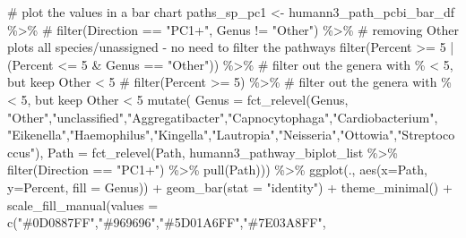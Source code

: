 \documentclass[
  letterpaper,
]{book}
\newenvironment{Shaded}{}{}
\newcommand{\AttributeTok}[1]{\textcolor[rgb]{0.84,0.23,0.29}{#1}}
\newcommand{\CommentTok}[1]{\textcolor[rgb]{0.42,0.45,0.49}{#1}}
\newcommand{\DecValTok}[1]{\textcolor[rgb]{0.00,0.36,0.77}{#1}}
\newcommand{\FunctionTok}[1]{\textcolor[rgb]{0.44,0.26,0.76}{#1}}
\newcommand{\NormalTok}[1]{\textcolor[rgb]{0.14,0.16,0.18}{#1}}
\newcommand{\OtherTok}[1]{\textcolor[rgb]{0.44,0.26,0.76}{#1}}
\newcommand{\SpecialCharTok}[1]{\textcolor[rgb]{0.00,0.36,0.77}{#1}}
\newcommand{\StringTok}[1]{\textcolor[rgb]{0.01,0.18,0.38}{#1}}
\begin{document}
\begin{Shaded}
\begin{Highlighting}[]
\CommentTok{\# plot the values in a bar chart}
\NormalTok{paths\_sp\_pc1 }\OtherTok{\textless{}{-}}\NormalTok{ humann3\_path\_pcbi\_bar\_df }\SpecialCharTok{\%\textgreater{}\%}
  \CommentTok{\# filter(Direction == "PC1+", Genus != "Other") \%\textgreater{}\% \# removing Other plots all species/unassigned {-} no need to filter the pathways}
  \FunctionTok{filter}\NormalTok{(Percent }\SpecialCharTok{\textgreater{}=} \DecValTok{5} \SpecialCharTok{|}\NormalTok{ (Percent }\SpecialCharTok{\textless{}=} \DecValTok{5} \SpecialCharTok{\&}\NormalTok{ Genus }\SpecialCharTok{==} \StringTok{"Other"}\NormalTok{)) }\SpecialCharTok{\%\textgreater{}\%} \CommentTok{\# filter out the genera with \% \textless{} 5, but keep Other \textless{} 5}
  \CommentTok{\# filter(Percent \textgreater{}= 5) \%\textgreater{}\% \# filter out the genera with \% \textless{} 5, but keep Other \textless{} 5}
  \FunctionTok{mutate}\NormalTok{(}
    \AttributeTok{Genus =} \FunctionTok{fct\_relevel}\NormalTok{(Genus, }\StringTok{"Other"}\NormalTok{,}\StringTok{"unclassified"}\NormalTok{,}\StringTok{"Aggregatibacter"}\NormalTok{,}\StringTok{"Capnocytophaga"}\NormalTok{,}\StringTok{"Cardiobacterium"}\NormalTok{,}
                        \StringTok{"Eikenella"}\NormalTok{,}\StringTok{"Haemophilus"}\NormalTok{,}\StringTok{"Kingella"}\NormalTok{,}\StringTok{"Lautropia"}\NormalTok{,}\StringTok{"Neisseria"}\NormalTok{,}\StringTok{"Ottowia"}\NormalTok{,}\StringTok{"Streptococcus"}\NormalTok{),}
         \AttributeTok{Path =} \FunctionTok{fct\_relevel}\NormalTok{(Path, humann3\_pathway\_biplot\_list }\SpecialCharTok{\%\textgreater{}\%}
                              \FunctionTok{filter}\NormalTok{(Direction }\SpecialCharTok{==} \StringTok{"PC1+"}\NormalTok{) }\SpecialCharTok{\%\textgreater{}\%}
                              \FunctionTok{pull}\NormalTok{(Path))) }\SpecialCharTok{\%\textgreater{}\%}
  \FunctionTok{ggplot}\NormalTok{(., }\FunctionTok{aes}\NormalTok{(}\AttributeTok{x=}\NormalTok{Path, }\AttributeTok{y=}\NormalTok{Percent, }\AttributeTok{fill =}\NormalTok{ Genus)) }\SpecialCharTok{+}
    \FunctionTok{geom\_bar}\NormalTok{(}\AttributeTok{stat =} \StringTok{"identity"}\NormalTok{) }\SpecialCharTok{+}
    \FunctionTok{theme\_minimal}\NormalTok{() }\SpecialCharTok{+}
    \FunctionTok{scale\_fill\_manual}\NormalTok{(}\AttributeTok{values =} \FunctionTok{c}\NormalTok{(}\StringTok{"\#0D0887FF"}\NormalTok{,}\StringTok{"\#969696"}\NormalTok{,}\StringTok{"\#5D01A6FF"}\NormalTok{,}\StringTok{"\#7E03A8FF"}\NormalTok{,}

\end{Highlighting}
\end{Shaded}
\end{document}
